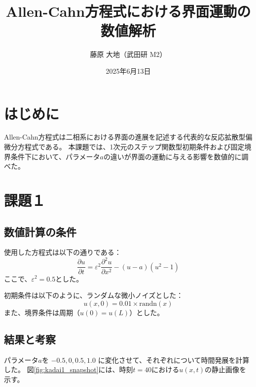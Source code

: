 \documentclass[a4paper,11pt]{article}
\title{Allen-Cahn方程式における界面運動の数値解析}
\author{藤原 大地（武田研 M2）}
\date{2025年6月13日}
\begin{document}
\maketitle

\section{はじめに}
Allen-Cahn方程式は二相系における界面の進展を記述する代表的な反応拡散型偏微分方程式である。
本課題では、1次元のステップ関数型初期条件および固定境界条件下において、パラメータ$a$の違いが界面の運動に与える影響を数値的に調べた。
\section{課題１}
\subsection{数値計算の条件}
使用した方程式は以下の通りである：
\[
\frac{\partial u}{\partial t} = \varepsilon^2 \frac{\partial^2 u}{\partial x^2} - (u-a)(u^2 - 1)
\]
ここで、$\varepsilon^2 = 0.5$とした。

初期条件は以下のように、ランダムな微小ノイズとした：
\[
u(x, 0) = 0.01 \times \text{randn}(x)
\]
また、境界条件は周期（$u(0) = u(L)$）とした。

\subsection{結果と考察}
パラメータ$a$を $-0.5, 0, 0.5, 1.0$ に変化させて、それぞれについて時間発展を計算した。
図\ref{fig:kadai1_snapshot}には、時刻$t = 40$における$u(x,t)$の静止画像を示す。
\end{document}
